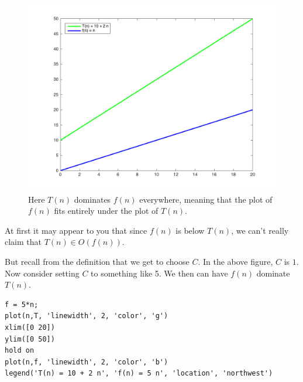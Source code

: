 \documentclass{tufte-handout}
\begin{document}
\begin{figure}
  \includegraphics{BigO1.png}
  \caption{Here $T(n)$ dominates $f(n)$ everywhere, meaning that the plot of $f(n)$ fits entirely under the plot of $T(n)$.}
  \label{fig:textfig}
\end{figure}

\pagebreak
At first it may appear to you that since $f(n)$ is below $T(n)$, we can't really claim that $T(n) \in O(f(n))$. 

But recall from the definition that we get to choose $C$. In the above figure, $C$ is $1$. 
Now consider setting $C$ to something like 5. We then can have $f(n)$ dominate $T(n)$. 

\bigskip 

 
 \begin{lstlisting}
f = 5*n; 
plot(n,T, 'linewidth', 2, 'color', 'g')
xlim([0 20])
ylim([0 50])
hold on
plot(n,f, 'linewidth', 2, 'color', 'b')
legend('T(n) = 10 + 2 n', 'f(n) = 5 n', 'location', 'northwest')
\end{lstlisting}
\end{document}
